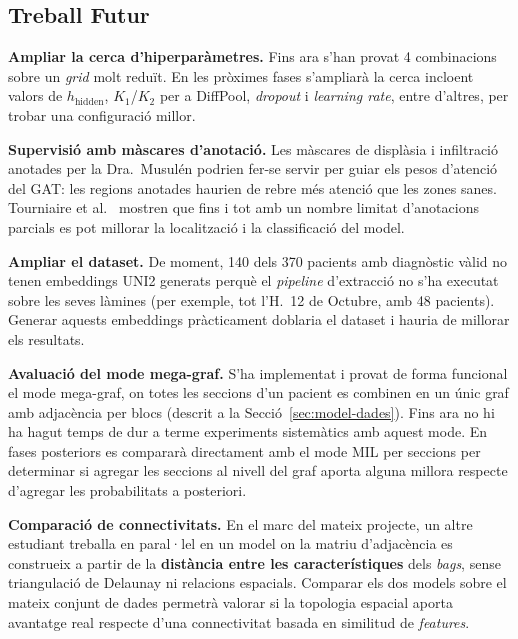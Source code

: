 \documentclass[10pt,a4paper,twocolumn,twoside]{article}
\begin{document}
\subsection{Treball Futur}

\textbf{Ampliar la cerca d'hiperparàmetres.} Fins ara s'han provat 4 combinacions sobre
un \textit{grid} molt reduït. En les pròximes fases s'ampliarà la cerca incloent valors
de $h_{\text{hidden}}$, $K_1$/$K_2$ per a DiffPool, \textit{dropout} i
\textit{learning rate}, entre d'altres, per trobar una configuració millor.

\textbf{Supervisió amb màscares d'anotació.} Les màscares de displàsia i infiltració
anotades per la Dra.\ Musulén podrien fer-se servir per guiar els pesos d'atenció del
GAT: les regions anotades haurien de rebre més atenció que les zones sanes. Tourniaire et
al.~\cite{TOURNIAIRE2023102763} mostren que fins i tot amb un nombre limitat d'anotacions
parcials es pot millorar la localització i la classificació del model.

\textbf{Ampliar el dataset.} De moment, 140 dels 370 pacients amb diagnòstic vàlid no
tenen embeddings UNI2 generats perquè el \textit{pipeline} d'extracció no s'ha executat
sobre les seves làmines (per exemple, tot l'H.\ 12 de Octubre, amb 48 pacients). Generar
aquests embeddings pràcticament doblaria el dataset i hauria de millorar els resultats.

\textbf{Avaluació del mode mega-graf.} S'ha implementat i provat de forma funcional el
mode mega-graf, on totes les seccions d'un pacient es combinen en un únic graf amb
adjacència per blocs (descrit a la Secció~\ref{sec:model-dades}). Fins ara no hi ha
hagut temps de dur a terme experiments sistemàtics amb aquest mode. En fases posteriors
es compararà directament amb el mode MIL per seccions per determinar si agregar les
seccions al nivell del graf aporta alguna millora respecte d'agregar les probabilitats
a posteriori.

\textbf{Comparació de connectivitats.} En el marc del mateix projecte, un altre estudiant
treballa en paral·lel en un model on la matriu d'adjacència es construeix a partir de la
\textbf{distància entre les característiques} dels \textit{bags}, sense triangulació de
Delaunay ni relacions espacials. Comparar els dos models sobre el mateix conjunt de dades
permetrà valorar si la topologia espacial aporta avantatge real respecte d'una
connectivitat basada en similitud de \textit{features}.

\printbibliography
\end{document}

